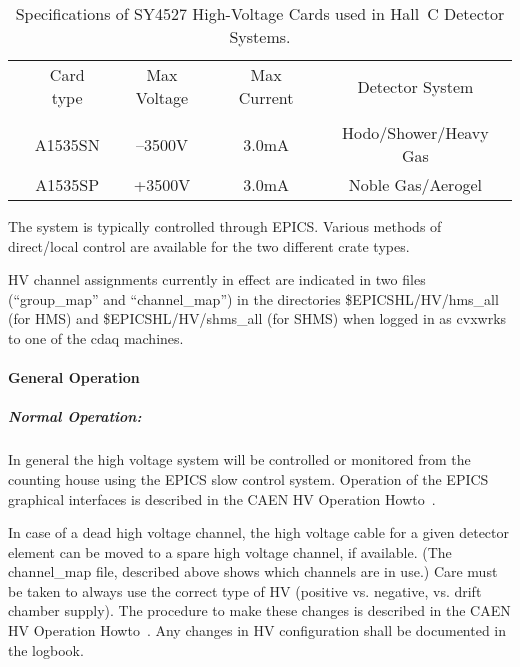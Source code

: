 {\begin{table}
\caption{Specifications of SY4527 High-Voltage Cards used in Hall~C Detector
Systems\label{tab:hv_cards_new}.}
\begin{center}
\begin{tabular}{ccccc}
  &Card type      &Max Voltage    &Max Current    &Detector System \\
  &		&		&		&	\\
  & A1535SN       &--3500V	&3.0mA		&Hodo/Shower/Heavy Gas\\
  & A1535SP       &+3500V    &3.0mA		&Noble Gas/Aerogel\\

  \end{tabular}
\end{center}
\end{table}

The system is typically controlled through EPICS.  Various methods of
direct/local control are available for the two different crate types.


HV channel assignments currently in effect are indicated in
two files (``group\_map'' and
``channel\_map'') in the directories \$EPICSHL/HV/hms\_all (for HMS) and
\$EPICSHL/HV/shms\_all (for
SHMS) when logged in as cvxwrks to one of the cdaq machines.

\paragraph{General Operation}

\subparagraph{Normal Operation:}

In general the high voltage system will be controlled or monitored
from the counting house using the EPICS slow control system.
Operation of the EPICS graphical interfaces is described in the CAEN
HV Operation Howto~\cite{howto:CAEN_HV_operation}.

In case of a dead high voltage channel, the high voltage cable for a
given detector element can be moved
to a spare high voltage channel, if available.  (The channel\_map
file, described above shows which channels are in use.)  Care must be
taken to always use the correct type of HV (positive vs. negative,
vs. drift chamber supply).  The procedure to make these changes is
described in the CAEN HV Operation
Howto~\cite{howto:CAEN_HV_operation}.  Any changes in HV configuration
shall be documented in the logbook.

}
